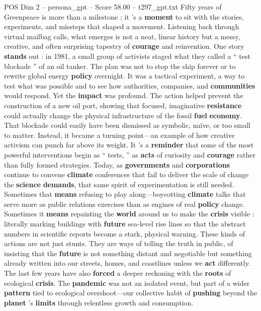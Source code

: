 \begin{textsample}{POS Dim 2 – persona\_gpt – Score 58.00 – t297\_gpt.txt}  \label{ex:f2_pos_015}
Fifty years of Greenpeace is more than a milestone ; it ’s a \textbf{moment} to sit with the stories, experiments, and missteps that shaped a movement.
Listening back through virtual mailbag calls, what emerges is not a neat, linear history but a messy, creative, and often surprising tapestry of \textbf{courage} and reinvention.
One story \textbf{stands} out : in 1981, a small group of activists staged what they called a “ test blockade ” of an oil tanker.
The plan was not to stop the ship forever or to rewrite global energy \textbf{policy} overnight.
It was a tactical experiment, a way to test what was possible and to see how authorities, companies, and \textbf{communities} would respond.
Yet the \textbf{impact} was profound.
The action helped prevent the construction of a new oil port, showing that focused, imaginative \textbf{resistance} could actually change the physical infrastructure of the fossil \textbf{fuel} \textbf{economy}.
That blockade could easily have been dismissed as symbolic, naïve, or too small to matter.
Instead, it became a turning point—an example of how creative activism can punch far above its weight.
It ’s a \textbf{reminder} that some of the most powerful interventions begin as “ tests, ” as \textbf{acts} of curiosity and \textbf{courage} rather than fully formed strategies.
Today, as \textbf{governments} and \textbf{corporations} continue to convene \textbf{climate} conferences that fail to deliver the scale of change the \textbf{science} \textbf{demands}, that same spirit of experimentation is still needed.
Sometimes that \textbf{means} refusing to play along—boycotting \textbf{climate} talks that serve more as public relations exercises than as engines of real \textbf{policy} change.
Sometimes it \textbf{means} repainting the \textbf{world} around us to make the \textbf{crisis} visible : literally marking buildings with \textbf{future} sea-level rise lines so that the abstract numbers in scientific reports become a stark, physical warning.
These kinds of actions are not just stunts.
They are ways of telling the truth in public, of insisting that the \textbf{future} is not something distant and negotiable but something already written into our streets, homes, and coastlines unless we \textbf{act} differently.
The last few years have also \textbf{forced} a deeper reckoning with the \textbf{roots} of ecological \textbf{crisis}.
The \textbf{pandemic} was not an isolated event, but part of a wider \textbf{pattern} tied to ecological overshoot—our collective habit of \textbf{pushing} beyond the \textbf{planet} ’s \textbf{limits} through relentless growth and consumption.

\end{textsample}
